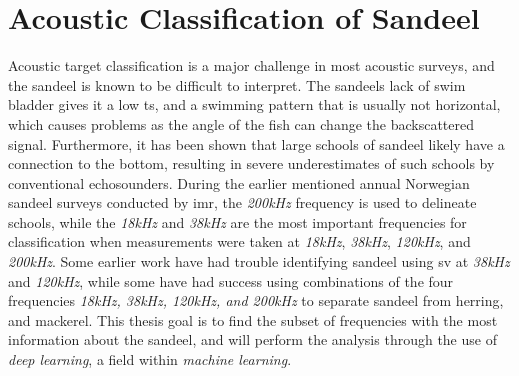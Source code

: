     
    
\section{Acoustic Classification of Sandeel} \label{acoustic classification sandeel}

Acoustic target classification is a major challenge in most acoustic surveys\cite{sizedependentfreqrespons2009johnsen}, and the sandeel is known to be difficult to interpret. The sandeels lack of swim bladder gives it a low \gls{ts}, and a swimming pattern that is usually not horizontal, which causes problems as the angle of the fish can change the backscattered signal\cite{Forland2014Broadbandwidth}. Furthermore, it has been shown that large schools of sandeel likely have a connection to the bottom, resulting in severe underestimates of such schools by conventional echosounders\cite{johnsen2017collective}. During the earlier mentioned annual Norwegian sandeel surveys conducted by \gls{imr}, the \textit{200kHz} frequency is used to delineate schools, while the \textit{18kHz} and \textit{38kHz} are the most important frequencies for classification when measurements were taken at \textit{18kHz}, \textit{38kHz}, \textit{120kHz}, and \textit{200kHz}\cite{sizedependentfreqrespons2009johnsen}. Some earlier work have had trouble identifying sandeel using \gls{sv} at \textit{38kHz} and \textit{120kHz}\cite{hassel2004influence,mackinson2005using,mosteiro2004dual,Greenstreet}, while some have had success using combinations of the four frequencies \textit{18kHz, 38kHz, 120kHz, and 200kHz} to separate sandeel from herring, and mackerel\cite{mohammed2006acoustic}. This thesis goal is to find the subset of frequencies with the most information about the sandeel, and will perform the analysis through the use of \textit{deep learning}, a field within \textit{machine learning}.

